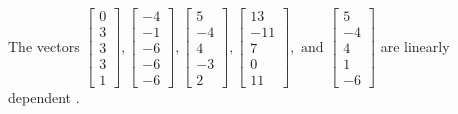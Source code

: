 \begin{exercise}
\begin{exerciseStatement}
  \end{exerciseStatement}
  \begin{exerciseAnswer}
   The vectors \(\left[\begin{array}{r}
0 \\
3 \\
3 \\
3 \\
1
\end{array}\right] , \left[\begin{array}{r}
-4 \\
-1 \\
-6 \\
-6 \\
-6
\end{array}\right] , \left[\begin{array}{r}
5 \\
-4 \\
4 \\
-3 \\
2
\end{array}\right] , \left[\begin{array}{r}
13 \\
-11 \\
7 \\
0 \\
11
\end{array}\right] , \text{ and } \left[\begin{array}{r}
5 \\
-4 \\
4 \\
1 \\
-6
\end{array}\right]\) are 
  	 linearly dependent  .
  


  \end{exerciseAnswer}
\end{exercise}